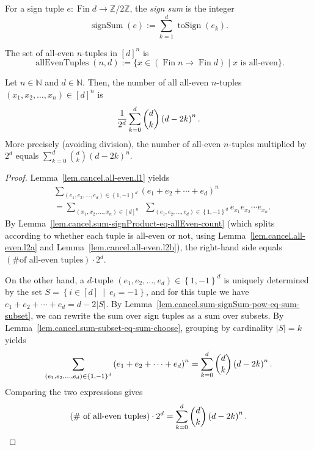 \begin{definition}
\label{def.cancel.signSum}
\leanhelper
\leanok
For a sign tuple $e : \operatorname{Fin} d \to \mathbb{Z}/2\mathbb{Z}$, the
\emph{sign sum} is the integer
\[
\operatorname{signSum}(e) := \sum_{k=1}^{d} \operatorname{toSign}(e_k).
\]
\end{definition}

\begin{definition}
\label{def.cancel.allEvenTuples}
\leanhelper
\leanok
The set of all-even $n$-tuples in $[d]^n$ is
\[
\operatorname{allEvenTuples}(n, d)
:= \{x \in (\operatorname{Fin} n \to \operatorname{Fin} d) \mid x \text{ is all-even}\}.
\]
\end{definition}

\begin{theorem}
\label{thm.cancel.all-even}
\leantarget
\leanok
Let $n\in\mathbb{N}$ and $d\in\mathbb{N}$.
Then, the number of all all-even $n$-tuples $\left(  x_{1},x_{2},\ldots
,x_{n}\right)  \in\left[  d\right]  ^{n}$ is
\[
\dfrac{1}{2^{d}}\sum_{k=0}^{d}\dbinom{d}{k}\left(  d-2k\right)  ^{n}.
\]
More precisely (avoiding division), the number of all-even $n$-tuples
multiplied by $2^d$ equals $\sum_{k=0}^{d}\binom{d}{k}(d-2k)^n$.
\end{theorem}

\begin{proof}
\leanok
Lemma~\ref{lem.cancel.all-even.l1} yields
\begin{align*}
&  \sum_{\left(  e_{1},e_{2},\ldots,e_{d}\right)  \in\left\{  1,-1\right\}
^{d}}\left(  e_{1}+e_{2}+\cdots+e_{d}\right)  ^{n}\\
&  =\sum_{\left(  x_{1},x_{2},\ldots,x_{n}\right)  \in\left[  d\right]  ^{n}%
}\ \ \sum_{\left(  e_{1},e_{2},\ldots,e_{d}\right)  \in\left\{  1,-1\right\}
^{d}}e_{x_{1}}e_{x_{2}}\cdots e_{x_{n}}.
\end{align*}
By Lemma~\ref{lem.cancel.sum-signProduct-eq-allEven-count}
(which splits according to whether each tuple is all-even or not,
using Lemma~\ref{lem.cancel.all-even.l2a} and
Lemma~\ref{lem.cancel.all-even.l2b}), the right-hand side equals
$(\text{\# of all-even tuples}) \cdot 2^d$.

On the other hand, a $d$-tuple $\left(  e_{1},e_{2},\ldots,e_{d}\right)  \in\left\{
1,-1\right\}  ^{d}$ is uniquely determined by the set $S = \left\{  i\in\left[
d\right]  \ \mid\ e_{i}=-1\right\}$, and for this tuple we have
$e_{1}+e_{2}+\cdots+e_{d}=d-2\left\vert S\right\vert$.
By Lemma~\ref{lem.cancel.sum-signSum-pow-eq-sum-subset}, we can rewrite
the sum over sign tuples as a sum over subsets.
By Lemma~\ref{lem.cancel.sum-subset-eq-sum-choose}, grouping by
cardinality $|S| = k$ yields
\[
\sum_{\left(  e_{1},e_{2},\ldots,e_{d}\right)  \in\left\{  1,-1\right\}  ^{d}%
}\left(  e_{1}+e_{2}+\cdots+e_{d}\right)  ^{n}=\sum_{k=0}^{d}\dbinom{d}%
{k}\left(  d-2k\right)  ^{n}.
\]
Comparing the two expressions gives
\[
\left(  \text{\# of all-even tuples}\right)  \cdot2^{d}=\sum_{k=0}^{d}\dbinom{d}%
{k}\left(  d-2k\right)  ^{n}.
\]
\end{proof}

